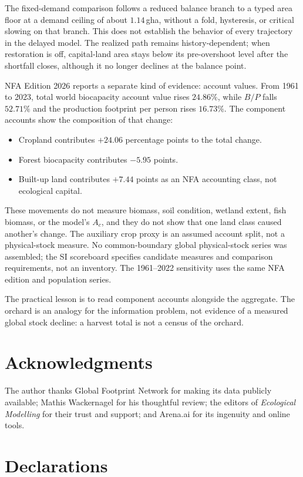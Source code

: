 \documentclass[preprint,12pt,authoryear]{elsarticle}
\begin{document}
The fixed-demand comparison follows a reduced balance branch to a typed area floor at a demand ceiling of about $1.14$\,gha, without a fold, hysteresis, or critical slowing on that branch. This does not establish the behavior of every trajectory in the delayed model. The realized path remains history-dependent; when restoration is off, capital-land area stays below its pre-overshoot level after the shortfall closes, although it no longer declines at the balance point.

NFA Edition 2026 reports a separate kind of evidence: account values. From 1961 to 2023, total world biocapacity account value rises $24.86\%$, while $B/P$ falls $52.71\%$ and the production footprint per person rises $16.73\%$. The component accounts show the composition of that change:
\begin{itemize}
\item Cropland contributes $+24.06$ percentage points to the total change.
\item Forest biocapacity contributes $-5.95$ points.
\item Built-up land contributes $+7.44$ points as an NFA accounting class, not ecological capital.
\end{itemize}
These movements do not measure biomass, soil condition, wetland extent, fish biomass, or the model's $A_c$, and they do not show that one land class caused another's change. The auxiliary crop proxy is an assumed account split, not a physical-stock measure. No common-boundary global physical-stock series was assembled; the SI scoreboard specifies candidate measures and comparison requirements, not an inventory. The 1961--2022 sensitivity uses the same NFA edition and population series.

The practical lesson is to read component accounts alongside the aggregate. The orchard is an analogy for the information problem, not evidence of a measured global stock decline: a harvest total is not a census of the orchard.

\section*{Acknowledgments}

The author thanks Global Footprint Network for making its data publicly available; Mathis Wackernagel for his thoughtful review; the editors of \emph{Ecological Modelling} for their trust and support; and Arena.ai for its ingenuity and online tools.

\section*{Declarations}
\end{document}
